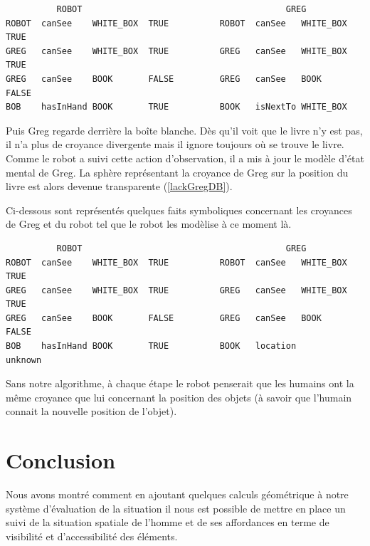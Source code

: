 \documentclass[a4paper,11pt,twoside]{StyleThese}
\begin{document}
\begin{scriptsize}
\begin{verbatim}
          ROBOT                                        GREG
ROBOT  canSee    WHITE_BOX  TRUE          ROBOT  canSee   WHITE_BOX   TRUE    
GREG   canSee    WHITE_BOX  TRUE          GREG   canSee   WHITE_BOX   TRUE
GREG   canSee    BOOK       FALSE         GREG   canSee   BOOK        FALSE
BOB    hasInHand BOOK       TRUE          BOOK   isNextTo WHITE_BOX
\end{verbatim}
\end{scriptsize}

Puis Greg regarde derrière la boîte blanche. Dès qu'il voit que le livre n'y est pas, il n'a plus de croyance divergente mais il ignore toujours où se trouve le livre. Comme le robot a suivi cette action d'observation, il a mis à jour le modèle d'état mental de Greg. La sphère représentant la croyance de Greg sur la position du livre est alors devenue transparente (\ref{lackGregDB}).

Ci-dessous sont représentés quelques faits symboliques concernant les croyances de Greg et du robot tel que le robot les modèlise à ce moment là.

\begin{scriptsize}
\begin{verbatim}
          ROBOT                                        GREG
ROBOT  canSee    WHITE_BOX  TRUE          ROBOT  canSee   WHITE_BOX   TRUE    
GREG   canSee    WHITE_BOX  TRUE          GREG   canSee   WHITE_BOX   TRUE
GREG   canSee    BOOK       FALSE         GREG   canSee   BOOK        FALSE
BOB    hasInHand BOOK       TRUE          BOOK   location             unknown
\end{verbatim}
\end{scriptsize}


Sans notre algorithme, à chaque étape le robot penserait que les humains ont la même croyance que lui concernant la position des objets (à savoir que l'humain connait la nouvelle position de l'objet).


\section{Conclusion}
Nous avons montré comment en ajoutant quelques calculs géométrique à notre système d'évaluation de la situation il nous est possible de mettre en place un suivi de la situation spatiale de l'homme et de ses affordances en terme de visibilité et d'accessibilité des éléments.
\end{document}

